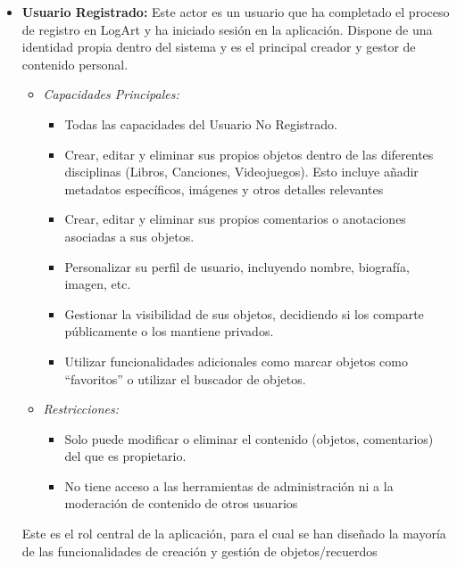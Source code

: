 \begin{itemize}
    \item \textbf{Usuario Registrado:}
    Este actor es un usuario que ha completado el proceso de registro en LogArt y ha iniciado sesión en la aplicación. Dispone de una identidad propia dentro del sistema y es el principal creador y gestor de contenido personal.
    \begin{itemize}
        \item \textit{Capacidades Principales:}
        \begin{itemize}
            \item Todas las capacidades del Usuario No Registrado.
            \item Crear, editar y eliminar sus propios objetos dentro de las diferentes disciplinas (Libros, Canciones, Videojuegos). Esto incluye añadir metadatos específicos, imágenes y otros detalles relevantes
            \item Crear, editar y eliminar sus propios comentarios o anotaciones asociadas a sus objetos.
            \item Personalizar su perfil de usuario, incluyendo nombre, biografía, imagen, etc.
            \item Gestionar la visibilidad de sus objetos, decidiendo si los comparte públicamente o los mantiene privados.
            \item Utilizar funcionalidades adicionales como marcar objetos como ``favoritos'' o utilizar el buscador de objetos.
        \end{itemize}
    \item \textit{Restricciones:}
    \begin{itemize}
        \item Solo puede modificar o eliminar el contenido (objetos, comentarios) del que es propietario.
        \item No tiene acceso a las herramientas de administración ni a la moderación de contenido de otros usuarios
    \end{itemize}
    \end{itemize}
    Este es el rol central de la aplicación, para el cual se han diseñado la mayoría de las funcionalidades de creación y gestión de objetos/recuerdos

    \vspace{0.5cm}


\end{itemize}
